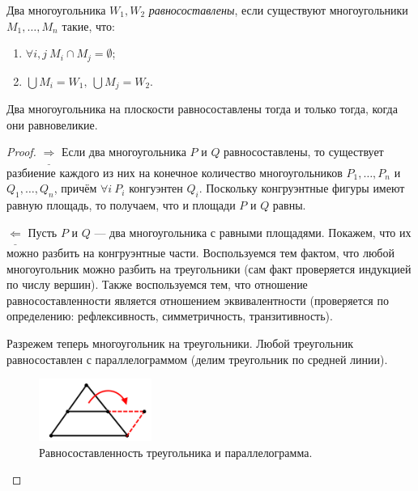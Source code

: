 \begin{definition}
    Два многоугольника $W_1, W_2$ \textit{равносоставлены}, если существуют многоугольники $M_1, \dots, M_n$ такие, что:
    \begin{enumerate}
        \item $\forall i, j \ M_i \cap M_j = \emptyset$;
        \item $\bigcup M_i = W_1, \ \bigcup M_j = W_2$.
    \end{enumerate} 
\end{definition}

\begin{theorem}
    Два многоугольника на плоскости равносоставлены тогда и только тогда, когда они равновеликие.
\end{theorem}
\begin{proof}
    $\underline{\Longrightarrow}$ Если два многоугольника $P$ и $Q$ равносоставлены, то существует разбиение каждого из них на конечное количество многоугольников $P_1, \dots, P_n$ и $Q_1, \dots, Q_n$, причём $\forall i \ P_i$ конгуэнтен $Q_i$. Поскольку конгруэнтные фигуры имеют равную площадь, то получаем, что и площади $P$ и $Q$ равны.

    $\underline{\Longleftarrow}$ Пусть $P$ и $Q$ — два многоугольника с равными площадями. Покажем, что их можно разбить на конгруэнтные части. Воспользуемся тем фактом, что любой многоугольник можно разбить на треугольники (сам факт проверяется индукцией по числу вершин). Также воспользуемся тем, что отношение равносоставленности является отношением эквивалентности (проверяется по определению: рефлексивность, симметричность, транзитивность).

    Разрежем теперь многоугольник на треугольники. Любой треугольник равносоставлен с параллелограммом (делим треугольник по средней линии).

    \begin{figure}[htbp]
        \centering
        \includegraphics[scale=1]{images/c8.1.png}
        \caption{Равносоставленность треугольника и параллелограмма.}
        \label{fig:c8.1}
    \end{figure}


\end{proof}
